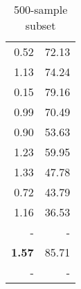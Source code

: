 \begin{table}[ht]
\begin{subtable}{0.19\linewidth}
{\begin{tabular}{rr}
\midrule
{0.52}   &  {72.13}  \\
{1.13}   &  {74.24}  \\
{0.15}   &  {79.16}  \\
\midrule
{0.99}   &  {70.49}  \\
{0.90}   &  {53.63}  \\
\midrule
{1.23}   &  {59.95}  \\
{1.33}   &  {47.78}  \\
\midrule
{0.72}   &  {43.79}  \\
{1.16}   &  {36.53}  \\
\midrule
 - & - \\
\midrule
\textbf{1.57}   &  {85.71}  \\
 - & - \\
\bottomrule
\end{tabular}}
\caption{\label{tab:correl-500-subset}500-sample subset}
\end{subtable}
\end{table}
